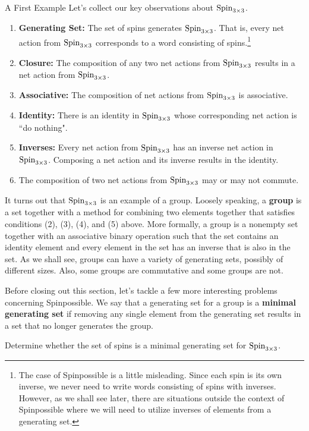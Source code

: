 \begin{section}{A First Example}
Let's collect our key observations about $\operatorname{Spin}_{3\times 3}$.
\begin{enumerate}[label=\rm{(\arabic*)}]
\item \textbf{Generating Set:} The set of spins generates $\operatorname{Spin}_{3\times 3}$.  That is, every net action from $\operatorname{Spin}_{3\times 3}$ corresponds to a word consisting of spins.\footnote{The case of Spinpossible is a little misleading. Since each spin is its own inverse, we never need to write words consisting of spins with inverses. However, as we shall see later, there are situations outside the context of Spinpossible where we will need to utilize inverses of elements from a generating set.} 
\item \textbf{Closure:} The composition of any two net actions from $\operatorname{Spin}_{3\times 3}$ results in a net action from $\operatorname{Spin}_{3\times 3}$.
\item \textbf{Associative:} The composition of net actions from $\operatorname{Spin}_{3\times 3}$ is associative.
\item \textbf{Identity:} There is an identity in $\operatorname{Spin}_{3\times 3}$ whose corresponding net action is ``do nothing".
\item \textbf{Inverses:} Every net action from $\operatorname{Spin}_{3\times 3}$ has an inverse net action in $\operatorname{Spin}_{3\times 3}$. Composing a net action and its inverse results in the identity.
\item The composition of two net actions from $\operatorname{Spin}_{3\times 3}$ may or may not commute.
\end{enumerate}

It turns out that $\operatorname{Spin}_{3\times 3}$ is an example of a group. Loosely speaking, a \textbf{group} is a set together with a method for combining two elements together that satisfies conditions (2), (3), (4), and (5) above.  More formally, a group is a nonempty set together with an associative binary operation such that the set contains an identity element and every element in the set has an inverse that is also in the set.  As we shall see, groups can have a variety of generating sets, possibly of different sizes. Also, some groups are commutative and some groups are not.

Before closing out this section, let's tackle a few more interesting problems concerning Spinpossible. We say that a generating set for a group is a \textbf{minimal generating set} if removing any single element from the generating set results in a set that no longer generates the group.

\begin{problem}
Determine whether the set of spins is a minimal generating set for $\operatorname{Spin}_{3\times 3}$.
\end{problem}


\end{section}
